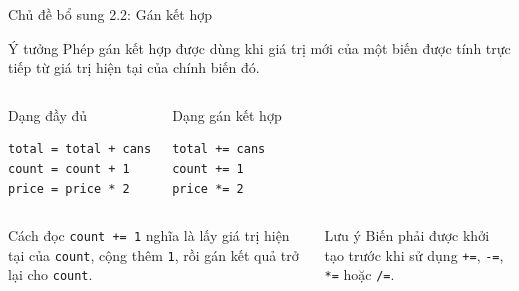 \documentclass[aspectratio=169,10pt]{beamer}
\begin{document}
\begin{frame}[fragile]{Chủ đề bổ sung 2.2: Gán kết hợp}
\small
\begin{block}{Ý tưởng}
Phép gán kết hợp được dùng khi giá trị mới của một biến được tính trực tiếp từ giá trị hiện tại của chính biến đó.
\end{block}
\vspace{0.15cm}
\begin{columns}[T,onlytextwidth]
\begin{exampleblock}{Dạng đầy đủ}
\begin{lstlisting}
total = total + cans
count = count + 1
price = price * 2
\end{lstlisting}
\end{exampleblock}
\begin{exampleblock}{Dạng gán kết hợp}
\begin{lstlisting}
total += cans
count += 1
price *= 2
\end{lstlisting}
\end{exampleblock}
\end{columns}
\vspace{0.2cm}
\begin{columns}[T,onlytextwidth]
\begin{block}{Cách đọc}
\texttt{count += 1} nghĩa là lấy giá trị hiện tại của \texttt{count}, cộng thêm \texttt{1}, rồi gán kết quả trở lại cho \texttt{count}.
\end{block}
\begin{alertblock}{Lưu ý}
Biến phải được khởi tạo trước khi sử dụng \texttt{+=}, \texttt{-=}, \texttt{*=} hoặc \texttt{/=}.
\end{alertblock}
\end{columns}
\end{frame}
\end{document}
